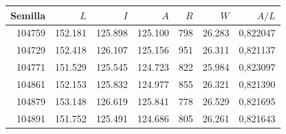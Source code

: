 \begin{tabular}{rrrrrrr}\hline
Semilla & $L$ & $I$ & $A$ & $R$ & $W$ & $A/L$ \\\hline
104759 & 152.181 & 125.898 & 125.100 & 798 & 26.283 & 0,822047 \\
104729 & 152.418 & 126.107 & 125.156 & 951 & 26.311 & 0,821137 \\
104771 & 151.529 & 125.545 & 124.723 & 822 & 25.984 & 0,823097 \\
104861 & 152.153 & 125.832 & 124.977 & 855 & 26.321 & 0,821390 \\
104879 & 153.148 & 126.619 & 125.841 & 778 & 26.529 & 0,821695 \\
104891 & 151.752 & 125.491 & 124.686 & 805 & 26.261 & 0,821643 \\
\hline\end{tabular}
